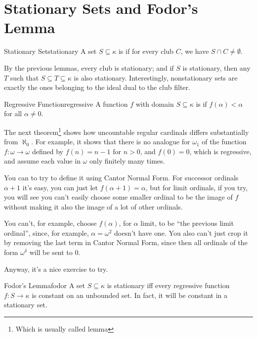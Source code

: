 \section{Stationary Sets and Fodor's Lemma}

\begin{definition}{Stationary Set}{stationary}
    A set $S\subseteq\kappa$ is  if for every club $C$, we have $S\cap C\neq\emptyset$.
\end{definition}

By the previous lemmas, every club is stationary; and if $S$ is stationary, then any $T$ such that $S\subseteq T\subseteq\kappa$ is also stationary. Interestingly, nonstationary sets are exactly the ones belonging to the ideal dual to the club filter.

\begin{definition}{Regressive Function}{regressive}
    A function $f$ with domain $S\subseteq\kappa$ is  if $f(\alpha)<\alpha$ for all $\alpha\neq0$.
\end{definition}

The next theorem\footnote{Which is usually called lemma} shows how uncountable regular cardinals differs substantially from $\aleph_0$. For example, it shows that there is no analogue for $\omega_1$ of the function $f:\omega\to\omega$ defined by $f(n)=n-1$ for $n>0$, and $f(0)=0$, which is regressive, and assume each value in $\omega$ only finitely many times.

You can to try to define it using Cantor Normal Form. For successor ordinals $\alpha+1$ it's easy, you can just let $f(\alpha+1)=\alpha$, but for limit ordinals, if you try, you will see you can't easily choose some smaller ordinal to be the image of $f$ without making it also the image of a lot of other ordinals.

You can't, for example, choose $f(\alpha)$, for $\alpha$ limit, to be ``the previous limit ordinal'', since, for example, $\alpha=\omega^2$ doesn't have one. You also can't just crop it by removing the last term in Cantor Normal Form, since then all ordinals of the form $\omega^\delta$ will be sent to $0$.

Anyway, it's a nice exercise to try.

\begin{theorem}{Fodor's Lemma}{fodor}
    A set $S\subseteq\kappa$ is stationary iff every regressive function $f:S\to\kappa$ is constant on an unbounded set. In fact, it will be constant in a stationary set.
\end{theorem}

